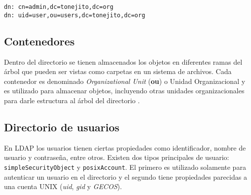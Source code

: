 {
\normalsize
\linespread{1}
\begin{center}
  \texttt{dn: cn=admin,dc=tonejito,dc=org}
  \\
  \texttt{dn: uid=user,ou=users,dc=tonejito,dc=org}
\end{center}
}

  \subsection{Contenedores}

Dentro del directorio se tienen almacenados los objetos en diferentes ramas del \'{a}rbol que pueden ser vistas como carpetas en un sistema de archivos. Cada contenedor es denominado \textit{Organizational Unit} (\textbf{ou}) o Unidad Organizacional y es utilizado para almacenar objetos, incluyendo otras unidades organizacionales para darle estructura al \'{a}rbol del directorio \cite{_appendix_????}.


  \subsection {Directorio de usuarios}

En \textsc{\gls{LDAP}}  los usuarios tienen ciertas propiedades como identificador, nombre de usuario y contrase\~{n}a, entre otros. Existen dos tipos principales de usuario: \texttt{simpleSecurityObject} y \texttt{posixAccount}. El primero es utilizado solamente para autenticar un usuario en el directorio y el segundo tiene propiedades parecidas a una cuenta \textsc{UNIX} (\textit{uid}, \textit{gid} y \textit{GECOS}).


